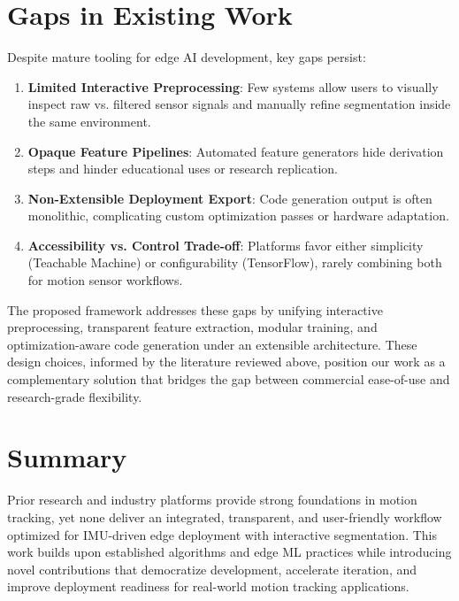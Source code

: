 \section{Gaps in Existing Work}
Despite mature tooling for edge AI development, key gaps persist:
\begin{enumerate}
    \item \textbf{Limited Interactive Preprocessing}: Few systems allow users to visually inspect raw vs. filtered sensor signals and manually refine segmentation inside the same environment.
    \item \textbf{Opaque Feature Pipelines}: Automated feature generators hide derivation steps and hinder educational uses or research replication.
    \item \textbf{Non-Extensible Deployment Export}: Code generation output is often monolithic, complicating custom optimization passes or hardware adaptation.
    \item \textbf{Accessibility vs. Control Trade-off}: Platforms favor either simplicity (Teachable Machine) or configurability (TensorFlow), rarely combining both for motion sensor workflows.
\end{enumerate}
The proposed framework addresses these gaps by unifying interactive preprocessing, transparent feature extraction, modular training, and optimization-aware code generation under an extensible architecture. These design choices, informed by the literature reviewed above, position our work as a complementary solution that bridges the gap between commercial ease-of-use and research-grade flexibility.

\section{Summary}
Prior research and industry platforms provide strong foundations in motion tracking, yet none deliver an integrated, transparent, and user-friendly workflow optimized for IMU-driven edge deployment with interactive segmentation. This work builds upon established algorithms and edge ML practices while introducing novel contributions that democratize development, accelerate iteration, and improve deployment readiness for real-world motion tracking applications.
